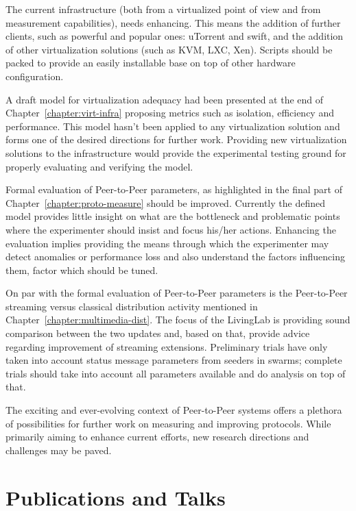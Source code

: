 The current infrastructure (both from a virtualized point of view and from
measurement capabilities), needs enhancing. This means the addition of further
clients, such as powerful and popular ones: uTorrent and swift, and the
addition of other virtualization solutions (such as KVM, LXC, Xen). Scripts
should be packed to provide an easily installable base on top of other
hardware configuration.

A draft model for virtualization adequacy had been presented at the end of
Chapter~\ref{chapter:virt-infra} proposing metrics such as isolation,
efficiency and performance. This model hasn't been applied to any
virtualization solution and forms one of the desired directions for further
work. Providing new virtualization solutions to the infrastructure would
provide the experimental testing ground for properly evaluating and verifying
the model.

Formal evaluation of Peer-to-Peer parameters, as highlighted in the final part
of Chapter~\ref{chapter:proto-measure} should be improved. Currently the
defined model provides little insight on what are the bottleneck and
problematic points where the experimenter should insist and focus his/her
actions. Enhancing the evaluation implies providing the means through which
the experimenter may detect anomalies or performance loss and also understand
the factors influencing them, factor which should be tuned.

On par with the formal evaluation of Peer-to-Peer parameters is the
Peer-to-Peer streaming versus classical distribution activity mentioned in
Chapter~\ref{chapter:multimedia-dist}. The focus of the LivingLab is
providing sound comparison between the two updates and, based on that, provide
advice regarding improvement of streaming extensions. Preliminary trials have
only taken into account status message parameters from seeders in swarms;
complete trials should take into account all parameters available and do
analysis on top of that.

The exciting and ever-evolving context of Peer-to-Peer systems offers a
plethora of possibilities for further work on measuring and improving
protocols. While primarily aiming to enhance current efforts, new research
directions and challenges may be paved.

\section{Publications and Talks}
\label{sec:conclusion:publications}

